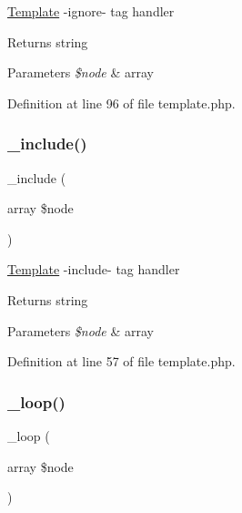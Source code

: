 \hyperlink{class_template}{Template} -\/ignore-\/ tag handler \begin{DoxyReturn}{Returns}
string 
\end{DoxyReturn}

\begin{DoxyParams}{Parameters}
{\em \$node} & array \\
\hline
\end{DoxyParams}


Definition at line 96 of file template.\+php.

\hypertarget{class_template_a93c6aa31effa27eea4ab693d6ee6bc56}{}\label{class_template_a93c6aa31effa27eea4ab693d6ee6bc56} 
\subsubsection{\texorpdfstring{\+\_\+include()}{\_include()}}
{\footnotesize\ttfamily \+\_\+include (\begin{DoxyParamCaption}\item[{array}]{\$node }\end{DoxyParamCaption})\hspace{0.3cm}{\ttfamily [protected]}}

\hyperlink{class_template}{Template} -\/include-\/ tag handler \begin{DoxyReturn}{Returns}
string 
\end{DoxyReturn}

\begin{DoxyParams}{Parameters}
{\em \$node} & array \\
\hline
\end{DoxyParams}


Definition at line 57 of file template.\+php.

\hypertarget{class_template_acd0e2435a35935eb2c0b6f7d5593b11a}{}\label{class_template_acd0e2435a35935eb2c0b6f7d5593b11a} 
\subsubsection{\texorpdfstring{\+\_\+loop()}{\_loop()}}
{\footnotesize\ttfamily \+\_\+loop (\begin{DoxyParamCaption}\item[{array}]{\$node }\end{DoxyParamCaption})\hspace{0.3cm}{\ttfamily [protected]}}


